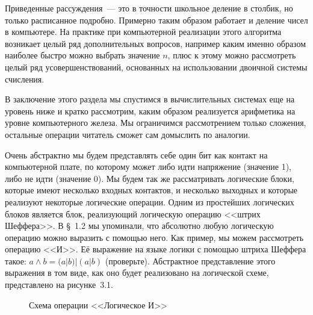 Приведенные рассуждения~--- это в точности школьное деление в столбик, но только расписанное подробно. Примерно таким образом работает и деление чисел в компьютере. На практике при компьютерной реализации этого алгоритма возникает целый ряд дополнительных вопросов, например каким именно образом наиболее быстро можно выбрать значение $n$, плюс к этому можно рассмотреть целый ряд усовершенствований, основанных на использовании двоичной системы счисления.

В заключение этого раздела мы спустимся в вычислительных системах еще на уровень ниже и кратко рассмотрим, каким образом реализуется арифметика на уровне компьютерного железа. Мы ограничимся рассмотрением только сложения, остальные операции читатель сможет сам домыслить по аналогии.

Очень абстрактно мы будем представлять себе один бит как контакт на компьютерной плате, по которому может либо идти напряжение (значение 1), либо не идти (значение 0). Мы будем так же рассматривать логические блоки, которые имеют несколько входных контактов, и несколько выходных и которые реализуют некоторые логические операции. Одним из простейших логических блоков является блок, реализующий логическую операцию <<штрих Шеффера>>. В \S~1.2 мы упоминали, что абсолютно любую логическую операцию можно выразить с помощью него. Как пример, мы можем рассмотреть операцию <<И>>. Её выражение на языке логики с помощью штриха Шеффера такое: $a\land b = (a|b)|(a|b)$ (проверьте). Абстрактное представление этого выражения в том виде, как оно будет реализовано на логической схеме, представлено на рисунке~3.1.
\begin{figure}[h]
\centering
{}
\caption{Схема операции <<Логическое И>>}
\end{figure}

